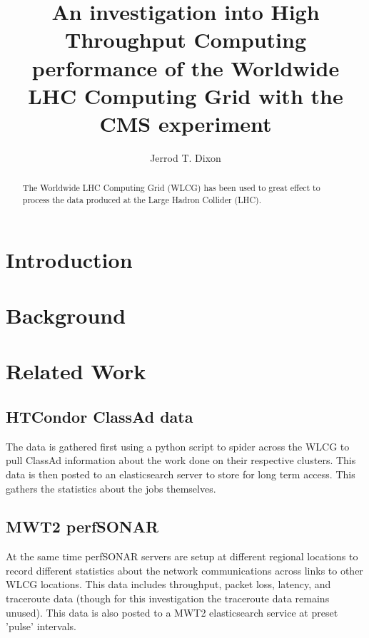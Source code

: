 \documentclass[sigconf]{acmart}
\title{An investigation into High Throughput Computing performance of the Worldwide LHC Computing Grid with the CMS experiment}
\author{Jerrod T. Dixon}
\affiliation{%
	\institution{University of Nebraska - Lincoln}
	\streetaddress{P.O. Box 1212}
	\city{Lincoln} 
	\state{Nebraska} 
	\postcode{43017-6221}
}
\begin{document}
\maketitle

\begin{abstract}
The Worldwide LHC Computing Grid (WLCG) has been used to great effect to process the data produced at the Large Hadron Collider (LHC). 
\end{abstract}

\section{Introduction}

\section{Background}

\section{Related Work}
\subsection{HTCondor ClassAd data}
The data is gathered first using a python script to spider across the WLCG to pull ClassAd information about the work done on their respective clusters. This data is then posted to an elasticsearch server to store for long term access. This gathers the statistics about the jobs themselves.
\subsection{MWT2 perfSONAR}
At the same time perfSONAR servers are setup at different regional locations to record different statistics about the network communications across links to other WLCG locations. This data includes throughput, packet loss, latency, and traceroute data (though for this investigation the traceroute data remains unused). This data is also posted to a MWT2 elasticsearch service at preset 'pulse' intervals.
\end{document}
